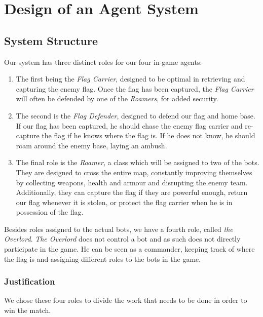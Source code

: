 \chapter{Design of an Agent System}
\section{System Structure}
Our system has three distinct roles for our four in-game agents:

\begin{enumerate}
\item The first being the \emph{Flag Carrier}, designed to be optimal in retrieving and capturing the enemy flag. Once the flag has been captured, the \emph{ Flag Carrier} will often be defended by one of the \emph{Roamers}, for added security.

\item The second is the \emph{Flag Defender}, designed to defend our flag and home base. If our flag has been captured, he should chase the enemy flag carrier and re-capture the flag if he knows where the flag is. If he does not know, he should roam around the enemy base, laying an ambush.

\item The final role is the \emph{Roamer}, a class which will be assigned to two of the bots. They are designed to cross the entire map, constantly improving themselves by collecting weapons, health and armour and disrupting the enemy team. Additionally, they can capture the flag if they are powerful enough, return our flag whenever it is stolen, or protect the flag carrier when he is in possession of the flag.
\end{enumerate}

Besides roles assigned to the actual bots, we have a fourth role, called \emph{the Overlord}. \emph{The Overlord} does not control a bot and as such does not directly participate in the game. He can be seen as a commander, keeping track of where the flag is and assigning different roles to the bots in the game.

\subsection{Justification}
We chose these four roles to divide the work that needs to be done in order to win the match.

